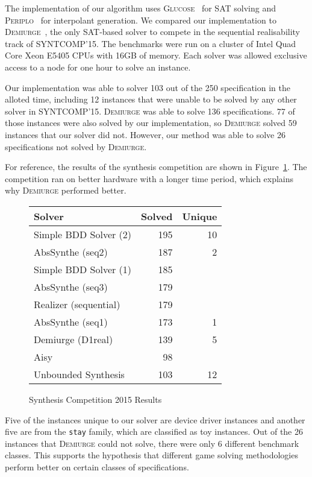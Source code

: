 \documentclass{llncs}
\begin{document}
The implementation of our algorithm uses \textsc{Glucose}~\cite{audemard2014}
for SAT solving and \textsc{Periplo}~\cite{rollini2013} for interpolant
generation. We compared our implementation to
\textsc{Demiurge}~\cite{bloem2014}, the only SAT-based solver to compete in the
sequential realisability track of SYNTCOMP'15. The benchmarks were run on a
cluster of Intel Quad Core Xeon E5405 CPUs with 16GB of memory.  Each solver
was allowed exclusive access to a node for one hour to solve an instance.

Our implementation was able to solver 103 out of the 250 specification in the
alloted time, including 12 instances that were unable to be solved by any other
solver in SYNTCOMP'15. \textsc{Demiurge} was able to solve 136 specifications.
77 of those instances were also solved by our implementation, so
\textsc{Demiurge} solved 59 instances that our solver did not. However, our
method was able to solve 26 specifications not solved by \textsc{Demiurge}.

For reference, the results of the synthesis competition are shown in
Figure~\ref{fig:syntcomp}. The competition ran on better hardware with a longer
time period, which explains why \textsc{Demiurge} performed better.

\begin{figure}
    \centering
    \setlength{\tabcolsep}{8pt}
    \begin{tabular}{l | r | r }
        \textbf{Solver} & \textbf{Solved} & \textbf{Unique} \\
        \hline
        Simple BDD Solver (2) & 195 & 10 \\
        AbsSynthe (seq2) & 187 & 2 \\
        Simple BDD Solver (1) & 185 & \\
        AbsSynthe (seq3) & 179 & \\
        Realizer (sequential) & 179 & \\
        AbsSynthe (seq1) & 173 & 1 \\
        Demiurge (D1real) & 139 & 5 \\
        Aisy & 98 & \\
        \hline
        Unbounded Synthesis & 103 & 12 \\
    \end{tabular}
    \caption{Synthesis Competition 2015 Results}
    \label{fig:syntcomp}
\end{figure}

Five of the instances unique to our solver are device driver instances and
another five are from the \texttt{stay} family, which are classified as toy
instances.  Out of the 26 instances that \textsc{Demiurge} could not solve,
there were only 6 different benchmark classes. This supports the hypothesis
that different game solving methodologies perform better on certain classes of
specifications.
\end{document}
